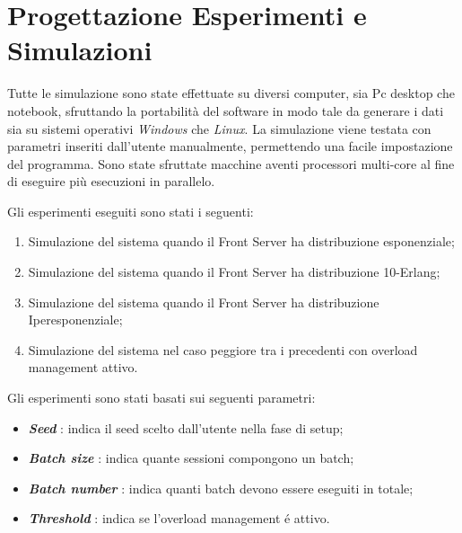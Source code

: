 \chapter{Progettazione Esperimenti e Simulazioni} 

Tutte le simulazione sono state effettuate su diversi computer, sia Pc desktop 
che notebook, sfruttando la portabilit\`a del software in modo tale da generare 
i dati sia su sistemi operativi \textit{Windows} che \textit{Linux}. La 
simulazione viene testata con parametri inseriti dall'utente manualmente, 
permettendo una facile impostazione del programma.
Sono state sfruttate macchine aventi processori multi-core al fine di eseguire 
pi\`u esecuzioni in parallelo.

\noindent Gli esperimenti eseguiti sono stati i seguenti:

\begin{enumerate}
 \item Simulazione del sistema quando il Front Server ha distribuzione 
esponenziale;
 \item Simulazione del sistema quando il Front Server ha distribuzione 
10-Erlang;
 \item Simulazione del sistema quando il Front Server ha distribuzione 
Iperesponenziale;
 \item Simulazione del sistema nel caso peggiore tra i precedenti con overload management attivo.
\end{enumerate}

\noindent \vspace{0.5cm} Gli esperimenti sono stati basati sui seguenti 
parametri:
\begin{itemize}
 \item \textbf{\textit{Seed}} : indica il seed scelto dall'utente nella fase di setup;
\begin{comment}
\item \textbf{\textit{START}} : indica l'inizio della simulazione, ovvero il primo stop.
\item \textbf{\textit{STOP}}  : indica il termine ultimo della simulazione.
\end{comment} 
 \item \textbf{\textit{Batch size}} : indica quante sessioni compongono un batch;
 \item \textbf{\textit{Batch number}} : indica quanti batch devono essere eseguiti in totale;
 \item \textbf{\textit{Threshold}} : indica se l'overload management \'e attivo.
 \begin{comment}
 \subitem \textbf{\textit{Batch size}} : indica quante sessioni compongono un batch;
 \subitem \textbf{\textit{Batch number}} : indica quanti batch devono essere eseguiti in totale;
 \end{comment}
\end{itemize}

